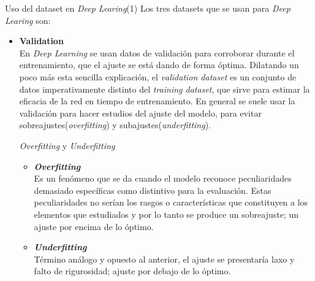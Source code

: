 \begin{teoria}{Uso del dataset en \textit{Deep Learing}(1)\textsuperscript{\cite{Andreas}}}
    \color{mitexto}
    Los tres datasets que se usan para \textit{Deep Learing} son:
    \begin{itemize}
        \itemsep0em
        \item \textbf{Validation}\\
        {\small En \textit{Deep Learning} se usan datos de validación para corroborar
        durante el entrenamiento, que el ajuste se está dando de forma óptima.\newline
        Dilatando un poco más esta sencilla explicación, el \textit{validation dataset}
        es un conjunto de datos imperativamente distinto del \textit{training dataset},
        que sirve para estimar la eficacia de la red en tiempo de entrenamiento.\newline
        En general se suele usar la validación para hacer estudios del ajuste del modelo,
        para evitar sobreajustes(\textit{overfitting}) y subajustes(\textit{underfitting}).}
        \begin{teoria}{\textit{Overfitting} y \textit{Underfitting}}
            \color{mitexto}
            \begin{itemize}
                \item \textbf{\textit{Overfitting}}\\
                {\small Es un fenómeno que se da cuando el modelo reconoce peculiaridades
                demasiado específicas como distintivo para la evaluación. Estas
                peculiaridades no serían los rasgos o características que constituyen
                a los elementos que estudiados y por lo tanto se produce un
                sobreajuste; un ajuste por encima de lo óptimo.} 
                \item \textbf{\textit{Underfitting}}\\
                {\small Término análogo y opuesto al anterior, el ajuste se
                presentaría laxo y falto de rigurosidad; ajuste por debajo de
                lo óptimo.} 
            \end{itemize}\end{teoria}
    \end{itemize}
\end{teoria}
